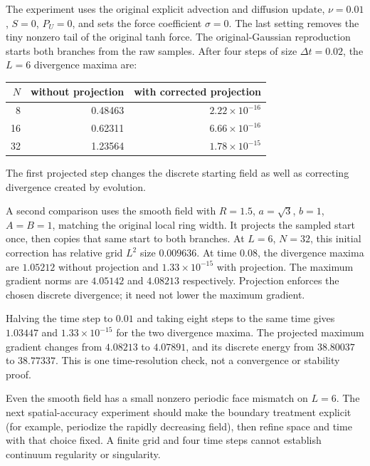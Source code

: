 \documentclass[11pt]{article}
\begin{document}
The experiment uses the original explicit advection and diffusion update,
$\nu=0.01$, $S=0$, $P_U=0$, and sets the force coefficient $\sigma=0$.
The last setting removes the tiny nonzero tail of the original tanh force.
The original-Gaussian reproduction starts both branches from the raw samples.
After four steps of size $\Delta t=0.02$, the $L=6$ divergence maxima are:
\begin{center}
\begin{tabular}{r r r}
\hline
$N$ & without projection & with corrected projection\\
\hline
8  & 0.48463 & $2.22\times10^{-16}$\\
16 & 0.62311 & $6.66\times10^{-16}$\\
32 & 1.23564 & $1.78\times10^{-15}$\\
\hline
\end{tabular}
\end{center}
The first projected step changes the discrete starting field as well as
correcting divergence created by evolution.

A second comparison uses the smooth field with
$R=1.5$, $a=\sqrt3$, $b=1$, $A=B=1$, matching the original local ring width.
It projects the sampled start once, then copies that same start to both
branches. At $L=6$, $N=32$, this initial correction has relative grid
$L^2$ size $0.009636$. At time $0.08$, the divergence maxima are
$1.05212$ without projection and $1.33\times10^{-15}$ with projection.
The maximum gradient norms are $4.05142$ and $4.08213$ respectively.
Projection enforces the chosen discrete divergence; it need not lower the
maximum gradient.

Halving the time step to $0.01$ and taking eight steps to the same time
gives $1.03447$ and $1.33\times10^{-15}$ for the two divergence maxima.
The projected maximum gradient changes from $4.08213$ to $4.07891$,
and its discrete energy from $38.80037$ to $38.77337$.
This is one time-resolution check, not a convergence or stability proof.

Even the smooth field has a small nonzero periodic face mismatch on $L=6$.
The next spatial-accuracy experiment should make the boundary treatment
explicit (for example, periodize the rapidly decreasing field), then refine
space and time with that choice fixed. A finite grid and four time steps
cannot establish continuum regularity or singularity.
\end{document}
